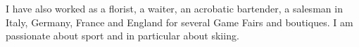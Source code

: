\documentclass[a4paper,10pt]{article}
\begin{document}
I have also worked as a florist, a waiter, an acrobatic bartender, a salesman in Italy, Germany, France and England for several Game Fairs and boutiques. I am passionate about sport and in particular about skiing.




\end{document}
